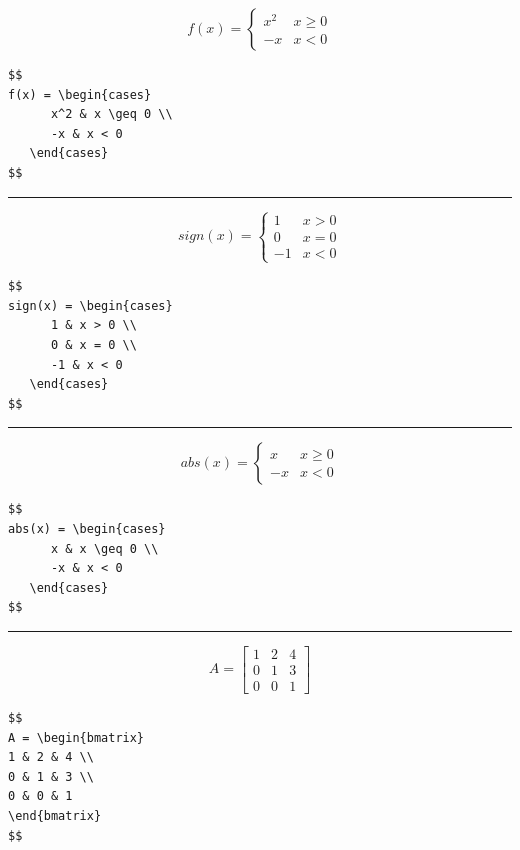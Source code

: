 \documentclass[12pt]{article}
\begin{document}
$$
f(x) = \begin{cases} 
      x^2 & x \geq 0 \\
      -x & x < 0 
   \end{cases}
$$

\begin{verbatim}
$$
f(x) = \begin{cases} 
      x^2 & x \geq 0 \\
      -x & x < 0 
   \end{cases}
$$
\end{verbatim}

\hrule

$$
sign(x) = \begin{cases} 
      1 & x > 0 \\
      0 & x = 0 \\
      -1 & x < 0 
   \end{cases}
$$

\begin{verbatim}
$$
sign(x) = \begin{cases} 
      1 & x > 0 \\
      0 & x = 0 \\
      -1 & x < 0 
   \end{cases}
$$
\end{verbatim}  

\hrule

$$
abs(x) = \begin{cases} 
      x & x \geq 0 \\
      -x & x < 0 
   \end{cases}  
$$

\begin{verbatim}
$$
abs(x) = \begin{cases} 
      x & x \geq 0 \\
      -x & x < 0 
   \end{cases}  
$$
\end{verbatim}

\hrule


$$
A = \begin{bmatrix}
1 & 2 & 4 \\
0 & 1 & 3 \\
0 & 0 & 1
\end{bmatrix}
$$

\begin{verbatim}
$$
A = \begin{bmatrix}
1 & 2 & 4 \\
0 & 1 & 3 \\
0 & 0 & 1
\end{bmatrix}
$$
\end{verbatim}
\end{document}
